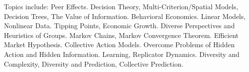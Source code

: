 \documentclass[11pt,a4paper]{moderncv}
\begin{document}
    {
        Topics include:                                                                                           %
            Peer Effects.                                                                                         %
            Decision Theory,                                                                                      %
            Multi-Criterion/Spatial Models,                                                                       %
            Decision Trees,                                                                                       %
            The Value of Information.                                                                             %
            Behavioral Economics.                                                                                 %
            Linear Models,                                                                                        %
            Nonlinear Data.                                                                                       %
            Tipping Points,                                                                                       %
            Economic Growth.                                                                                      %
            Diverse Perspectives and Heuristics of Groups.                                                        %
            Markov Chains,                                                                                        %
            Markov Convergence Theorem.                                                                           %
            Efficient Market Hypothesis.                                                                          %
            Collective Action Models.                                                                             %
            Overcome Problems of Hidden Action and Hidden Information.                                            %
            Learning,                                                                                             %
            Replicator Dynamics.                                                                                  %
            Diversity and Complexity,                                                                             %
            Diversity and Prediction,                                                                             %
       Collective Prediction.                                                                                     %
    }                                                                                                             %
\end{document}
